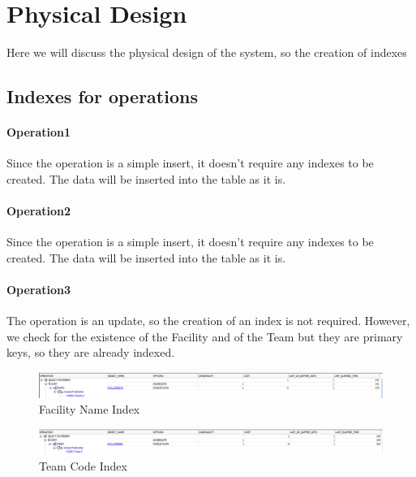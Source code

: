 \section{Physical Design}

Here we will discuss the physical design of the system, so the creation of indexes


\subsection{Indexes for operations}

\paragraph{Operation1} \leavevmode \newline
Since the operation is a simple insert, it doesn't require any indexes to be created. The data will be inserted into the table as it is.

\paragraph{Operation2} \leavevmode \newline
Since the operation is a simple insert, it doesn't require any indexes to be created. The data will be inserted into the table as it is.

\paragraph{Operation3} \leavevmode \newline
The operation is an update, so the creation of an index is not required. However, we check for the existence of the Facility and of the Team but they are primary keys, so they are already indexed.

\begin{figure}[H]
    \centering
    \includegraphics[width=\textwidth]{images/FacilityName.png}
    \caption{Facility Name Index}
\end{figure}

\begin{figure}[H]
    \centering
    \includegraphics[width=\textwidth]{images/TeamCode.png}
    \caption{Team Code Index}
\end{figure}

